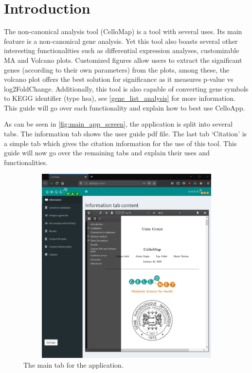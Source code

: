 \documentclass[11pt]{article}
\begin{document}
\newpage
\thispagestyle{empty}


\tableofcontents


\newpage
\section{Introduction \label{intro}}
The non-canonical analysis tool (CelloMap) is a tool with several uses. Its main feature is a non-canonical gene analysis. Yet this tool also boasts several other interesting functionalities such as differential expression analyses, customizable MA and Volcano plots. Customized figures allow users to extract the significant genes (according to their own parameters) from the plots, among these, the volcano plot offers the best solution for significance as it measures p-value vs log2FoldChange. Additionally, this tool is also capable of converting gene symbols to \acrshort{KEGG} identifier (type \acrshort{hsa}), see \autoref{gene_list_analysis} for more information.
This guide will go over each functionality and explain how to best use CelloApp.

As can be seen in \autoref{fig:main_app_screen}, the application is split into several tabs. The information tab shows the user guide pdf file. The last tab `Citation' is a simple tab which gives the citation information for the use of this tool. This guide will now go over the remaining tabs and explain their uses and functionalities.
\begin{figure}[h!]
\centering
\includegraphics[width=15cm,height=10cm,keepaspectratio]{main_app_screen.png}
\caption{The main tab for the application.}
\label{fig:main_app_screen}
\end{figure}
\end{document}
